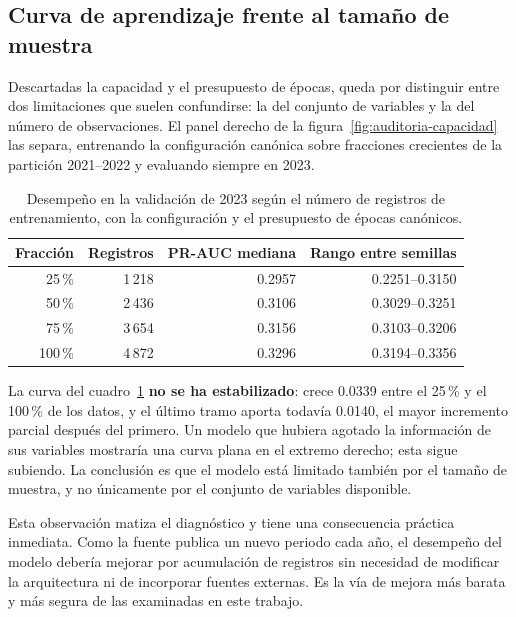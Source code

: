 \subsection{Curva de aprendizaje frente al tamaño de muestra}\label{sec:muestra}
Descartadas la capacidad y el presupuesto de épocas, queda por distinguir entre dos limitaciones que suelen confundirse: la del conjunto de variables y la del número de observaciones. El panel derecho de la figura~\ref{fig:auditoria-capacidad} las separa, entrenando la configuración canónica sobre fracciones crecientes de la partición 2021--2022 y evaluando siempre en 2023.

\begin{table}[tbp]\centering\small
\caption{Desempeño en la validación de 2023 según el número de registros de entrenamiento, con la configuración y el presupuesto de épocas canónicos.}
\label{tab:muestra}
\begin{tabular}{rrrr}\toprule
Fracción & Registros & PR-AUC mediana & Rango entre semillas \\\midrule
25\,\% & 1\,218 & 0.2957 & 0.2251--0.3150 \\
50\,\% & 2\,436 & 0.3106 & 0.3029--0.3251 \\
75\,\% & 3\,654 & 0.3156 & 0.3103--0.3206 \\
100\,\% & 4\,872 & 0.3296 & 0.3194--0.3356 \\\bottomrule
\end{tabular}
\end{table}

La curva del cuadro~\ref{tab:muestra} \textbf{no se ha estabilizado}: crece 0.0339 entre el 25\,\% y el 100\,\% de los datos, y el último tramo aporta todavía 0.0140, el mayor incremento parcial después del primero. Un modelo que hubiera agotado la información de sus variables mostraría una curva plana en el extremo derecho; esta sigue subiendo. La conclusión es que el modelo está limitado también por el tamaño de muestra, y no únicamente por el conjunto de variables disponible.

Esta observación matiza el diagnóstico y tiene una consecuencia práctica inmediata. Como la fuente publica un nuevo periodo cada año, el desempeño del modelo debería mejorar por acumulación de registros sin necesidad de modificar la arquitectura ni de incorporar fuentes externas. Es la vía de mejora más barata y más segura de las examinadas en este trabajo.

